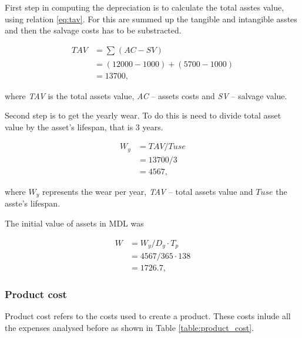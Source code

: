 First step in computing the depreciation is to calculate the total asstes value, using relation \eqref{eq:tav}. For this are summed up the tangible and intangible asstes and then the salvage costs has to be substracted. 

\begin{equation}\label{tav}
 \begin{split}
  TAV &= \sum_{} (AC - SV) \\
        &= (12000 - 1000) + (5700 - 1000) \\
        &= 13700,
 \end{split}
\end{equation}

\noindent
where \textit{TAV} is the total assets value, \textit{AC} -- assets costs and \textit{SV} -- salvage value.

Second step is to get the yearly wear. To do this is need to divide total asset value by the asset's lifespan, that is 3 years.

\begin{equation}
 \begin{split}
  W_{y} &= TAV/T{use} \\
        &= 13700/3 \\
        &= 4567,
 \end{split}
\end{equation}

\noindent
where $W_{y}$ represents the wear per year, \textit{TAV} -- total assets value and $T{use}$ the asste's lifespan. 

The initial value of assets in MDL was

\begin{equation}
 \begin{split}
  W &= W_{y}/D_{y} \cdot T_{p} \\
    &= 4567/365 \cdot 138 \\
    &= 1726.7,
 \end{split}
\end{equation}

\subsubsection{Product cost}

Product cost refers to the costs used to create a product. These costs inlude all the expenses analysed before as shown in Table \ref{table:product_cost}.

